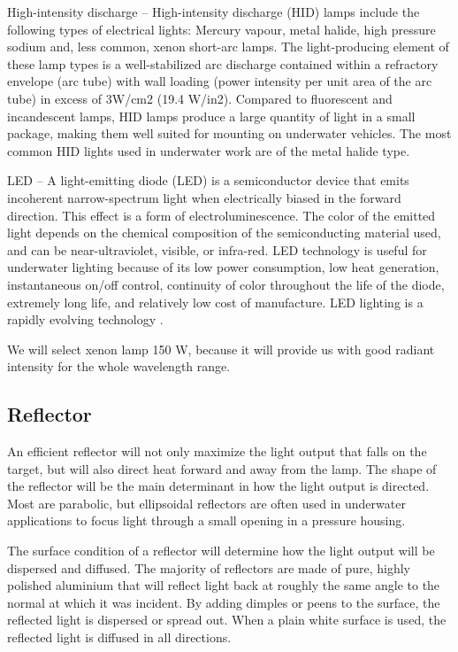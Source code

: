 High-intensity discharge – High-intensity discharge (HID) lamps include the
following types of electrical lights: Mercury vapour, metal halide, high pressure sodium and, less common, xenon short-arc lamps. The light-producing element of these lamp types is a well-stabilized arc discharge contained within a refractory envelope (arc tube) with wall loading (power intensity per unit area of the arc tube) in excess of 3W/cm2 (19.4 W/in2). Compared to fluorescent and incandescent lamps, HID lamps produce a large quantity of light in a small package, making them well suited for mounting on underwater vehicles. The most common HID lights used in underwater work are of the metal halide type.

LED – A light-emitting diode (LED) is a semiconductor device that emits incoherent narrow-spectrum light when electrically biased in the forward direction. This effect is a form of electroluminescence. The color of the emitted light depends on the chemical composition of the semiconducting material used, and can be near-ultraviolet, visible, or infra-red. LED technology is useful for underwater lighting because of its low power consumption, low heat generation, instantaneous on/off control, continuity of color throughout the life of the diode, extremely long life, and relatively low cost of manufacture. LED lighting is a rapidly evolving technology \cite{lighting}.

We will select xenon lamp 150 W, because it will provide us with good radiant intensity for the whole wavelength range.

\subsection{Reflector}
An efficient reflector will not only maximize the light output that falls on the target, but will also direct heat forward and away from the lamp. The shape of the reflector will be the main determinant in how the light output is directed. Most are parabolic, but ellipsoidal reflectors are often used in underwater applications to focus light through a small opening in a pressure housing. 

The surface condition of a reflector
will determine how the light output will be dispersed and diffused. The majority of reflectors are made of pure, highly polished aluminium that will reflect light back at roughly the same angle to the normal at which it was incident. By adding dimples or peens to the surface, the reflected light is dispersed or spread out. When a plain white surface is used, the reflected light is diffused in all directions.

